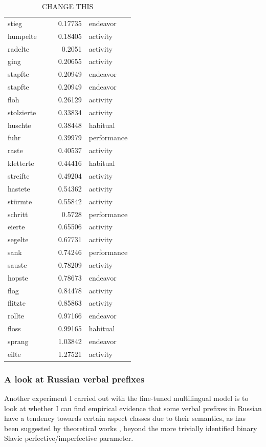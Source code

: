 \begin{table}[h!]
\begin{tabular}[t]{|l|c|c|r|l|}
        stieg &  &  & 0.17735 & endeavor\\
        humpelte &  &  & 0.18405 & activity\\
        radelte &  &  & 0.2051 & activity\\
        ging &  &  & 0.20655 & activity\\
        stapfte &  &  & 0.20949 & endeavor\\
        stapfte &  &  & 0.20949 & endeavor\\
        floh &  &  & 0.26129 & activity\\
        stolzierte &  &  & 0.33834 & activity\\
        huschte &  &  & 0.38448 & habitual\\
        fuhr &  &  & 0.39979 & performance\\
        raste &  &  & 0.40537 & activity\\
        kletterte &  &  & 0.44416 & habitual\\
        streifte &  &  & 0.49204 & activity\\
        hastete &  &  & 0.54362 & activity\\
        stürmte &  &  & 0.55842 & activity\\
        schritt &  &  & 0.5728 & performance\\
        eierte &  &  & 0.65506 & activity\\
        segelte &  &  & 0.67731 & activity\\
        sank &  &  & 0.74246 & performance\\
        sauste &  &  & 0.78209 & activity\\
        hopste &  &  & 0.78673 & endeavor\\
        flog &  &  & 0.84478 & activity\\
        flitzte &  &  & 0.85863 & activity\\
        rollte &  &  & 0.97166 & endeavor\\
        floss &  &  & 0.99165 & habitual\\
        sprang &  &  & 1.03842 & endeavor\\
        eilte &  &  & 1.27521 & activity\\
        \hline
    \end{tabular}
    \caption{CHANGE THIS}
\end{table}


\subsubsection{A look at Russian verbal prefixes}
Another experiment I carried out with the fine-tuned multilingual model is to look at whether I can find empirical evidence that some verbal prefixes in Russian have a tendency towards certain aspect classes due to their semantics, as has been suggested by theoretical works \citep{0a0c5a60-a736-3226-b927-03ba8af4fd75, dickey2000parameters}, beyond the more trivially identified binary Slavic perfective/imperfective parameter.

